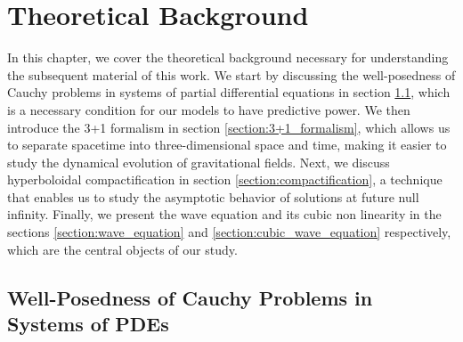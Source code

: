 
\chapter{Theoretical Background}
\label{chapter:background}

In this chapter, we cover the theoretical background necessary for understanding the subsequent material of this work. We start by discussing the well-posedness of Cauchy problems in systems of partial differential equations in section \ref{section:well-posedness}, which is a necessary condition for our models to have predictive power. We then introduce the 3+1 formalism in section \ref{section:3+1_formalism}, which allows us to separate spacetime into three-dimensional space and time, making it easier to study the dynamical evolution of gravitational fields. Next, we discuss hyperboloidal compactification in section \ref{section:compactification}, a technique that enables us to study the asymptotic behavior of solutions at future null infinity. Finally, we present the wave equation and its cubic non linearity in the sections \ref{section:wave_equation} and \ref{section:cubic_wave_equation} respectively, which are the central objects of our study.


\section{Well-Posedness of Cauchy Problems in Systems of PDEs}
\label{section:well-posedness}

